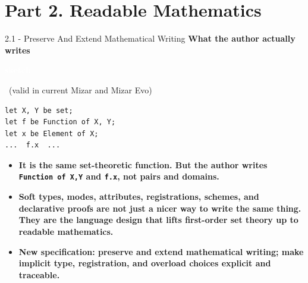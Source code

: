 \documentclass[aspectratio=169,11pt]{beamer}
\newcommand{\statusbadge}[2]{\colorbox{#1}{\textcolor{white}{\strut\scriptsize\sffamily\bfseries #2}}}
\newcommand{\badgeSketch}{\statusbadge{orange!75!black}{sketch}}
\begin{document}
\section{Part 2. Readable Mathematics}
\begin{frame}[fragile,t]{2.1 - Preserve And Extend Mathematical Writing}
\smallskip
\textbf{What the author actually writes}~\badgeSketch~{\footnotesize(valid in current Mizar and Mizar Evo)}
\begin{lstlisting}[language={mizar},basicstyle=\ttfamily\small]
let X, Y be set;
let f be Function of X, Y;
let x be Element of X;
...  f.x  ...
\end{lstlisting}
\begin{itemize}
\setlength{\itemsep}{1pt}
\setlength{\parsep}{0pt}
\setlength{\parskip}{0pt}
\item \textcolor{blue!55!black}{\textbf{It is the same set-theoretic function. But the author writes \texttt{Function of X,Y} and \texttt{f.x}, not pairs and domains.}}
\item \textcolor{blue!55!black}{\textbf{Soft types, modes, attributes, registrations, schemes, and declarative proofs are not just a nicer way to write the same thing. They are the language design that lifts first-order set theory up to readable mathematics.}}
\item \textcolor{blue!55!black}{\textbf{New specification: preserve and extend mathematical writing; make implicit type, registration, and overload choices explicit and traceable.}}
\end{itemize}
\end{frame}
\end{document}
